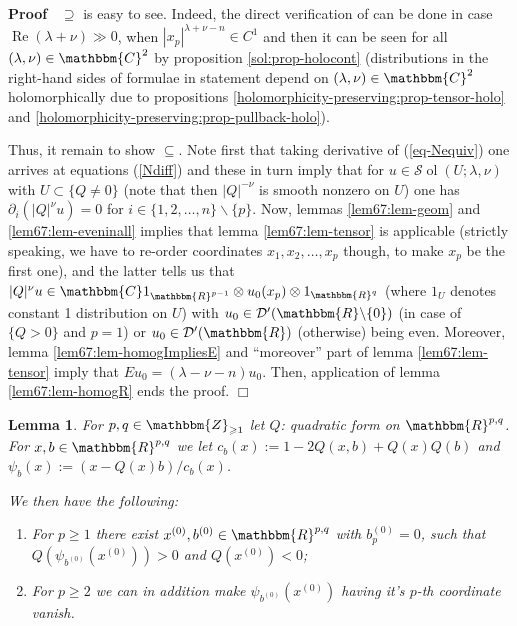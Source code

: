 \documentclass[12pt]{article}
\newcommand{\assign}{:=}
\newcommand{\tmop}[1]{\ensuremath{\operatorname{#1}}}
\renewenvironment{proof}{\noindent\textbf{Proof\ }}{\hspace*{\fill}$\Box$\medskip}
\newtheorem{lemma}[proposition]{Lemma}
\theoremstyle{remark}
\begin{document}
\begin{proof}
  $\supseteq$ is easy to see. Indeed, the direct verification of can be done
  in case $\tmop{Re} (\lambda + \nu) \gg 0$, when $| x_p |^{\lambda + \nu - n}
  \in C^1$ and then it can be seen for all $(\lambda, \nu) \in \mathbbm{C}^2$
  by proposition \ref{sol:prop-holocont} (distributions in the right-hand
  sides of formulae in statement depend on $(\lambda, \nu) \in \mathbbm{C}^2$
  holomorphically due to propositions
  \ref{holomorphicity-preserving:prop-tensor-holo} and
  \ref{holomorphicity-preserving:prop-pullback-holo}).
  
  Thus, it remain to show $\subseteq$. Note first that taking derivative of
  (\ref{eq-Nequiv}) one arrives at equations (\ref{Ndiff}) and these in turn
  imply that for $u \in \mathcal{S} \tmop{ol} (U ; \lambda, \nu)$ with $U
  \subset \{ Q \neq 0 \}$ (note that then $| Q |^{- \nu}$ is smooth nonzero on
  $U$) one has $\partial_i (| Q |^{\nu} u) = 0$ for $i \in \{ 1, 2, \ldots, n
  \} \backslash \{ p \}$. Now, lemmas \ref{lem67:lem-geom} and
  \ref{lem67:lem-eveninall} implies that lemma \ref{lem67:lem-tensor} is
  applicable (strictly speaking, we have to re-order coordinates $x_1, x_2,
  \ldots, x_p$ though, to make $x_p$ be the first one), and the latter tells
  us that $| Q |^{\nu} u \in \mathbbm{C}1_{\mathbbm{R}^{p - 1}} \otimes u_0
  (x_p) \otimes 1_{\mathbbm{R}^q}$ (where $1_U$ denotes constant 1
  distribution on $U$) with $u_0 \in \mathcal{D}' (\mathbbm{R}\backslash \{ 0
  \})$ (in case of $\{ Q > 0 \}$ and $p = 1$) or $u_0 \in \mathcal{D}'
  (\mathbbm{R})$ (otherwise) being even. Moreover, lemma
  \ref{lem67:lem-homogImpliesE} and ``moreover'' part of lemma
  \ref{lem67:lem-tensor} imply that $E u_0 = (\lambda - \nu - n) u_0$. Then,
  application of lemma \ref{lem67:lem-homogR} ends the proof.
\end{proof}

\begin{lemma}
  \label{lem67:lem-flip}For $p, q \in \mathbbm{Z}_{\geqslant 1}$ let $Q$:
  quadratic form on $\mathbbm{R}^{p, q}$. For $x, b \in \mathbbm{R}^{p, q}$ we
  let $c_b (x) \assign 1 - 2 Q (x, b) + Q (x) Q (b)$ and $\psi_b (x) \assign
  (x - Q (x) b) / c_b (x)$.
  
  We then have the following:
  \begin{enumerate}
    \item For $p \geqslant 1$ there exist $x^{(0)}, b^{(0)} \in
    \mathbbm{R}^{p, q}$ with $b^{(0)}_p = 0$, such that $Q (\psi_{b^{(0)}}
    (x^{(0)})) > 0$ and $Q (x^{(0)}) < 0$;
    
    \item For $p \geqslant 2$ we can in addition make $\psi_{b^{(0)}}
    (x^{(0)})$ having it's $p$-th coordinate vanish.
  \end{enumerate}
\end{lemma}
\end{document}
